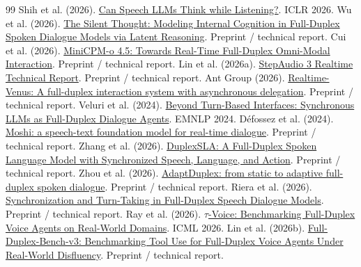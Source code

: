 \begin{thebibliography}{99}
Shih et al. (2026). \href{https://proceedings.iclr.cc/paper_files/paper/2026/file/75c45fca2aa416ada062b26cc4fb7641-Paper-Conference.pdf}{Can Speech LLMs Think while Listening?}. ICLR 2026.
Wu et al. (2026). \href{https://arxiv.org/abs/2603.17837}{The Silent Thought: Modeling Internal Cognition in Full-Duplex Spoken Dialogue Models via Latent Reasoning}. Preprint / technical report.
Cui et al. (2026). \href{https://arxiv.org/abs/2604.27393}{MiniCPM-o 4.5: Towards Real-Time Full-Duplex Omni-Modal Interaction}. Preprint / technical report.
Lin et al. (2026a). \href{https://arxiv.org/abs/2609.14005}{StepAudio 3 Realtime Technical Report}. Preprint / technical report.
Ant Group (2026). \href{https://arxiv.org/abs/2609.13814}{Realtime-Venus: A full-duplex interaction system with asynchronous delegation}. Preprint / technical report.
Veluri et al. (2024). \href{https://aclanthology.org/2024.emnlp-main.1192/}{Beyond Turn-Based Interfaces: Synchronous LLMs as Full-Duplex Dialogue Agents}. EMNLP 2024.
Défossez et al. (2024). \href{https://arxiv.org/abs/2410.00037}{Moshi: a speech-text foundation model for real-time dialogue}. Preprint / technical report.
Zhang et al. (2026). \href{https://arxiv.org/abs/2605.20755}{DuplexSLA: A Full-Duplex Spoken Language Model with Synchronized Speech, Language, and Action}. Preprint / technical report.
Zhou et al. (2026). \href{https://arxiv.org/abs/2609.29217}{AdaptDuplex: from static to adaptive full-duplex spoken dialogue}. Preprint / technical report.
Riera et al. (2026). \href{https://arxiv.org/abs/2605.20356}{Synchronization and Turn-Taking in Full-Duplex Speech Dialogue Models}. Preprint / technical report.
Ray et al. (2026). \href{https://proceedings.mlr.press/v306/ray26a.html}{$\tau$-Voice: Benchmarking Full-Duplex Voice Agents on Real-World Domains}. ICML 2026.
Lin et al. (2026b). \href{https://arxiv.org/abs/2604.04847}{Full-Duplex-Bench-v3: Benchmarking Tool Use for Full-Duplex Voice Agents Under Real-World Disfluency}. Preprint / technical report.

\end{thebibliography}
